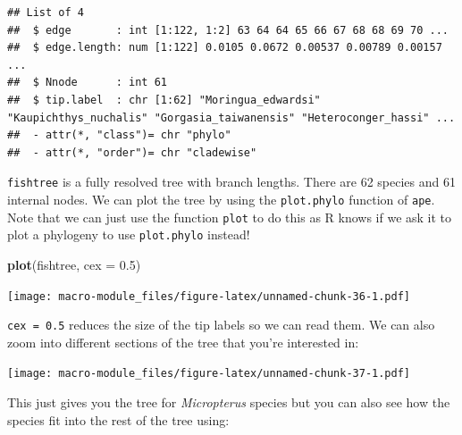 \documentclass[]{book}
\newenvironment{Shaded}{\begin{snugshade}}{\end{snugshade}}
\newcommand{\KeywordTok}[1]{\textcolor[rgb]{0.13,0.29,0.53}{\textbf{{#1}}}}
\newcommand{\DataTypeTok}[1]{\textcolor[rgb]{0.13,0.29,0.53}{{#1}}}
\newcommand{\FloatTok}[1]{\textcolor[rgb]{0.00,0.00,0.81}{{#1}}}
\newcommand{\StringTok}[1]{\textcolor[rgb]{0.31,0.60,0.02}{{#1}}}
\newcommand{\OtherTok}[1]{\textcolor[rgb]{0.56,0.35,0.01}{{#1}}}
\newcommand{\NormalTok}[1]{{#1}}
\theoremstyle{definition}
\theoremstyle{definition}
\theoremstyle{definition}
\theoremstyle{remark}
\begin{document}
\begin{verbatim}
## List of 4
##  $ edge       : int [1:122, 1:2] 63 64 64 65 66 67 68 68 69 70 ...
##  $ edge.length: num [1:122] 0.0105 0.0672 0.00537 0.00789 0.00157 ...
##  $ Nnode      : int 61
##  $ tip.label  : chr [1:62] "Moringua_edwardsi" "Kaupichthys_nuchalis" "Gorgasia_taiwanensis" "Heteroconger_hassi" ...
##  - attr(*, "class")= chr "phylo"
##  - attr(*, "order")= chr "cladewise"
\end{verbatim}

\texttt{fishtree} is a fully resolved tree with branch lengths. There
are 62 species and 61 internal nodes. We can plot the tree by using the
\texttt{plot.phylo} function of \texttt{ape}. Note that we can just use
the function \texttt{plot} to do this as R knows if we ask it to plot a
phylogeny to use \texttt{plot.phylo} instead!

\begin{Shaded}
\begin{Highlighting}[]
\KeywordTok{plot}\NormalTok{(fishtree, }\DataTypeTok{cex =} \FloatTok{0.5}\NormalTok{)}
\end{Highlighting}
\end{Shaded}

\texttt{[image: macro-module\_files/figure-latex/unnamed-chunk-36-1.pdf]}

\texttt{cex\ =\ 0.5} reduces the size of the tip labels so we can read
them. We can also zoom into different sections of the tree that you're
interested in:

\begin{Shaded}
\end{Shaded}

\texttt{[image: macro-module\_files/figure-latex/unnamed-chunk-37-1.pdf]}

This just gives you the tree for \emph{Micropterus} species but you can
also see how the species fit into the rest of the tree using:

\begin{Shaded}
\end{Shaded}
\end{document}
